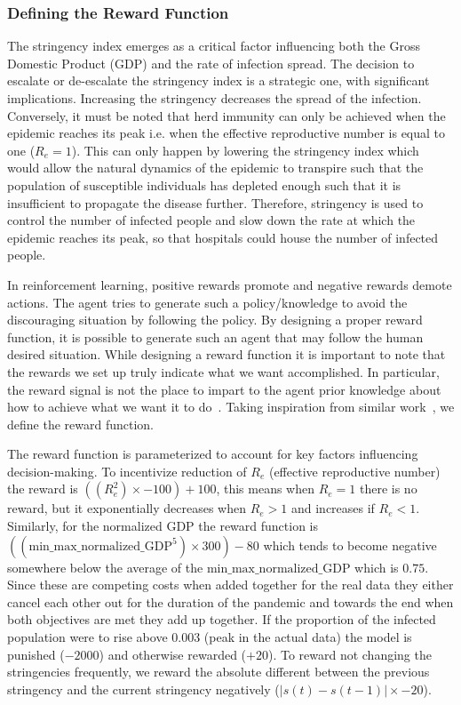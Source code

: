\documentclass[tikz,fleqn,12pt]{wlscirep}
\begin{document}
\subsubsection{Defining the Reward Function}\label{defining_reward_function}
The stringency index emerges as a critical factor influencing both the Gross Domestic Product (GDP) and the rate of infection spread. The decision to escalate or de-escalate the stringency index is a strategic one, with significant implications. Increasing the stringency decreases the spread of the infection. Conversely, it must be noted that herd immunity can only be achieved when the epidemic reaches its peak i.e. when the effective reproductive number is equal to one ($R_e = 1$). This can only happen by lowering the stringency index which would allow the natural dynamics of the epidemic to transpire such that the population of susceptible individuals has depleted enough such that it is insufficient to propagate the disease further. Therefore, stringency is used to control the number of infected people and slow down the rate at which the epidemic reaches its peak, so that hospitals could house the number of infected people.

In reinforcement learning, positive rewards promote and negative rewards demote actions. The agent tries to generate such a policy/knowledge to avoid the discouraging situation by following the policy. By designing a proper reward function, it is possible to generate such an agent that may follow the human desired situation. While designing a reward function it is important to note that the rewards we set up truly indicate what we want accomplished. In particular, the reward signal is not the place to impart to the agent prior knowledge about how to achieve what we want it to do~\cite{sutton2018reinforcement}. Taking inspiration from similar work~\cite{Ohi2020}, we define the reward function. %

The reward function is parameterized to account for key factors influencing decision-making. To incentivize reduction of $R_e$ (effective reproductive number) the reward is $((R_e^{2}) \times -100) + 100$, this means when $R_e = 1$ there is no reward, but it exponentially decreases when $R_e > 1$ and increases if $R_e < 1$. Similarly, for the normalized GDP the reward function is $((\textrm{min\_max\_normalized\_GDP}^5) \times 300) - 80$ which tends to become negative somewhere below the average of the $\textrm{min\_max\_normalized\_GDP}$ which is $0.75$. Since these are competing costs when added together for the real data they either cancel each other out for the duration of the pandemic and towards the end when both objectives are met they add up together.
If the proportion of the infected population were to rise above 0.003 (peak in the actual data) the model is punished ($-2000$) and otherwise rewarded ($+20$). To reward not changing the stringencies frequently, we reward the absolute different between the previous stringency and the current stringency negatively ($|s(t) - s(t-1)| \times -20$).
\end{document}
